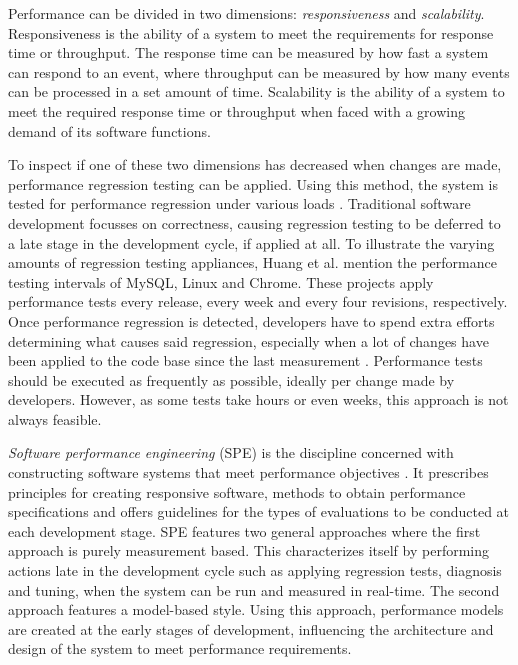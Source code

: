Performance can be divided in two dimensions: \emph{responsiveness} and \emph{scalability}.
Responsiveness is the ability of a system to meet the requirements for response time or throughput.
The response time can be measured by how fast a system can respond to an event, where throughput can be measured by how many events can be processed in a set amount of time.
Scalability is the ability of a system to meet the required response time or throughput when faced with a growing demand of its software functions.

To inspect if one of these two dimensions has decreased when changes are made, performance regression testing can be applied.
Using this method, the system is tested for performance regression under various loads \cite{woodside2007future}.
Traditional software development focusses on correctness, causing regression testing to be deferred to a late stage in the development cycle, if applied at all.
To illustrate the varying amounts of regression testing appliances, Huang et al. mention the performance testing intervals of MySQL, Linux and Chrome.
These projects apply performance tests every release, every week and every four revisions, respectively.
Once performance regression is detected, developers have to spend extra efforts determining what causes said regression, especially when a lot of changes have been applied to the code base since the last measurement \cite{huang2014performance}.
Performance tests should be executed as frequently as possible, ideally per change made by developers.
However, as some tests take hours or even weeks, this approach is not always feasible.

\emph{Software performance engineering} (SPE) is the discipline concerned with constructing software systems that meet performance objectives \cite{smith2003best}.
It prescribes principles for creating responsive software, methods to obtain performance specifications and offers guidelines for the types of evaluations to be conducted at each development stage.
SPE features two general approaches \cite{woodside2007future} where the first approach is purely measurement based.
This characterizes itself by performing actions late in the development cycle such as  applying regression tests, diagnosis and tuning, when the system can be run and measured in real-time.
The second approach features a model-based style.
Using this approach, performance models are created at the early stages of development, influencing the architecture and design of the system to meet performance requirements.

